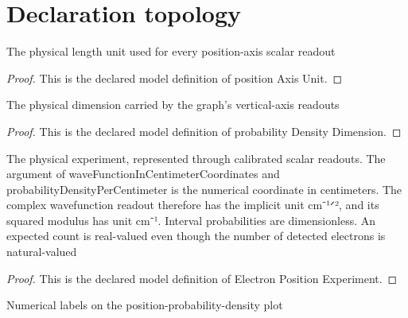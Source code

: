 \section{Declaration topology}
\begin{definition}
  \label{def:physics:phyx-mini-0505:phyxminiproblems-problemphyxmini0505-positionaxisunit}
  The physical length unit used for every position-axis scalar readout
\end{definition}
\begin{proof}
  This is the declared model definition of position Axis Unit.
\end{proof}
\begin{definition}
  \label{def:physics:phyx-mini-0505:phyxminiproblems-problemphyxmini0505-probabilitydensitydimension}
  The physical dimension carried by the graph's vertical-axis readouts
\end{definition}
\begin{proof}
  This is the declared model definition of probability Density Dimension.
\end{proof}
\begin{definition}
  \label{def:physics:phyx-mini-0505:phyxminiproblems-problemphyxmini0505-electronpositionexperiment}
  The physical experiment, represented through calibrated scalar readouts. The argument of waveFunctionInCentimeterCoordinates and probabilityDensityPerCentimeter is the numerical coordinate in centimeters. The complex wavefunction readout therefore has the implicit unit cm⁻¹ᐟ², and its squared modulus has unit cm⁻¹. Interval probabilities are dimensionless. An expected count is real-valued even though the number of detected electrons is natural-valued
\end{definition}
\begin{proof}
  This is the declared model definition of Electron Position Experiment.
\end{proof}
\begin{definition}
  \label{def:physics:phyx-mini-0505:phyxminiproblems-problemphyxmini0505-probabilitydensityfigureaxes}
  Numerical labels on the position-probability-density plot
\end{definition}
